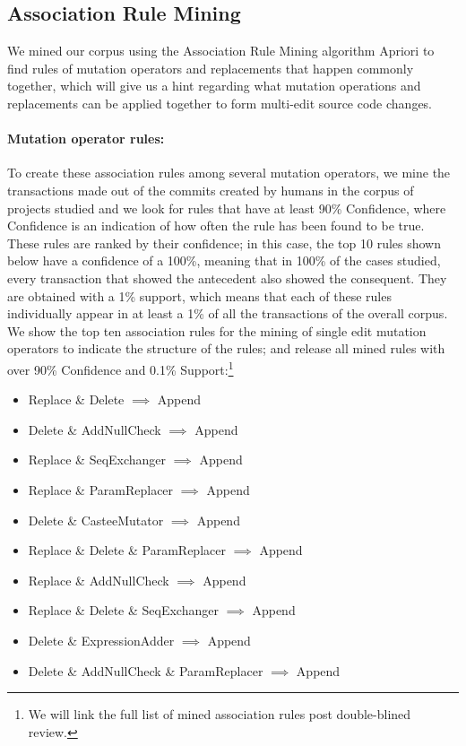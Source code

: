 \documentclass[conference]{IEEEtran}
\begin{document}
\subsection{Association Rule Mining} \label{armRes}

We mined our corpus using the Association Rule Mining algorithm Apriori 
to find rules of mutation operators and 
replacements that happen commonly together, which will give us a hint regarding
what mutation operations and replacements can be applied together to form multi-edit
source code changes.

\paragraph{Mutation operator rules:}
To create these association rules among several mutation operators, we mine the
transactions made out of the commits created by humans in the corpus of projects
studied and we look for rules that have at least 90\% Confidence, where
Confidence is an indication of how often the rule has been found to be true.  
These rules are ranked by their confidence; in this case, the top 10 rules shown
below have a confidence of a 100\%, meaning that in 100\% of the cases
studied, every transaction that showed the antecedent also showed the consequent.
They are obtained with a 1\% support, which means that each of these rules
individually appear in at least a 1\% of all the transactions of the overall
corpus. We show the top ten association rules for the mining of single edit 
mutation operators to indicate the structure of the rules; and release all mined
rules with over 90\% Confidence and 0.1\% Support:\footnote{We 
  will link the full list of mined association rules post double-blined
  review.} 

\begin{itemize}
\item Replace \& Delete $\implies$ Append
\item Delete \& AddNullCheck $\implies$ Append
\item Replace \& SeqExchanger $\implies$ Append
\item Replace \& ParamReplacer $\implies$ Append
\item Delete \& CasteeMutator $\implies$ Append
\item Replace \& Delete \& ParamReplacer $\implies$ Append
\item Replace \& AddNullCheck $\implies$ Append
\item Replace \& Delete \& SeqExchanger $\implies$ Append
\item Delete \& ExpressionAdder $\implies$ Append
\item Delete \& AddNullCheck \& ParamReplacer $\implies$ Append
\end{itemize}
\end{document}

